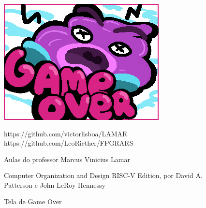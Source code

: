 \documentclass[a4paper]{sbgames}
\begin{document}
\begin{figure}[H]
  \begin{center}
   \includegraphics[width=1.0\linewidth]{./Figures/GameOver.PNG}
  \end{center}
  \caption{Tela de Game Over}
  \label{fig:05}




https://github.com/victorlisboa/LAMAR
https://github.com/LeoRiether/FPGRARS

Aulas do professor Marcus Vinicius Lamar

Computer Organization and Design RISC-V Edition, por David A. Patterson e John LeRoy Hennessy




\end{figure}
\end{document}
